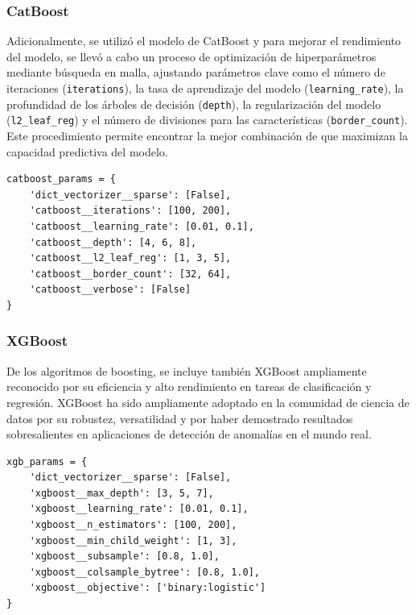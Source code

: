 \documentclass[11pt,a4paper,spanish]{book}
\numberwithin{equation}{chapter}
\numberwithin{figure}{chapter}
\begin{document}
\subsubsection{CatBoost}

Adicionalmente, se utilizó el modelo de CatBoost y para mejorar el rendimiento del 
modelo, se llevó a cabo un proceso de optimización de hiperparámetros mediante búsqueda 
en malla, ajustando parámetros clave como el número de iteraciones (\lstinline|iterations|),
la tasa de aprendizaje del modelo (\lstinline|learning_rate|), la profundidad de los 
árboles de decisión (\lstinline|depth|), la regularización del modelo 
(\lstinline|l2_leaf_reg|) y el número de divisiones para las características 
(\lstinline|border_count|). Este procedimiento permite encontrar la mejor combinación de 
que maximizan la capacidad predictiva del modelo.


\vspace{5mm}
\begin{lstlisting}
catboost_params = {
    'dict_vectorizer__sparse': [False],
    'catboost__iterations': [100, 200],
    'catboost__learning_rate': [0.01, 0.1],
    'catboost__depth': [4, 6, 8],
    'catboost__l2_leaf_reg': [1, 3, 5],
    'catboost__border_count': [32, 64],
    'catboost__verbose': [False]
}
\end{lstlisting}


\subsubsection{XGBoost}

De los algoritmos de boosting, se incluye también XGBoost ampliamente reconocido por su 
eficiencia y alto rendimiento en tareas de clasificación y regresión. XGBoost ha sido 
ampliamente adoptado en la comunidad de ciencia de datos por su robustez, versatilidad y 
por haber demostrado resultados sobresalientes en aplicaciones de detección de anomalías 
en el mundo real.


\vspace{5mm}
\begin{lstlisting}
xgb_params = {
    'dict_vectorizer__sparse': [False],
    'xgboost__max_depth': [3, 5, 7],
    'xgboost__learning_rate': [0.01, 0.1],
    'xgboost__n_estimators': [100, 200],
    'xgboost__min_child_weight': [1, 3],
    'xgboost__subsample': [0.8, 1.0],
    'xgboost__colsample_bytree': [0.8, 1.0],
    'xgboost__objective': ['binary:logistic']
}
\end{lstlisting}
\end{document}
